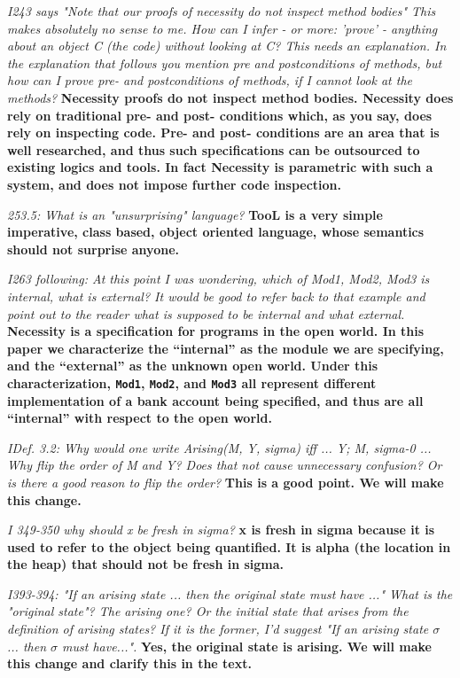 \documentclass[11pt]{amsart}
\newcommand{\rev}[1]{\emph #1}
\newcommand{\us}[1]{\bf #1}
\begin{document}
{\rev {{I243 says "Note that our proofs of necessity do not inspect method bodies" This makes absolutely no sense to me. How can I infer - or more: 'prove' - anything about an object C (the code) without looking at C? This needs an explanation. In the explanation that follows you mention pre and postconditions of methods, but how can I prove pre- and postconditions of methods, if I cannot look at the methods? }}}
{\us{Necessity proofs do not inspect method bodies. Necessity does rely on traditional pre- and post- conditions which, as you say, does rely on inspecting code. Pre- and post- conditions are an area that is well researched, and thus such specifications can be outsourced to existing logics and tools. In fact Necessity is parametric with such a system, and does not impose further code inspection.}}

{\rev {{253.5: What is an "unsurprising" language?}}}
{\us{TooL is a very simple imperative, class based, object oriented language, whose semantics should not surprise anyone.}}

{\rev {{I263 following: At this point I was wondering, which of Mod1, Mod2, Mod3 is internal, what is external? It would be good to refer back to that example and point out to the reader what is supposed to be internal and what external. }}}
{\us{Necessity is a specification for programs in the open world. In this paper we characterize the ``internal'' as the module we are specifying, and the ``external'' as the unknown open world. 
Under this characterization, \texttt{Mod1}, \texttt{Mod2}, and \texttt{Mod3} all represent different implementation of a bank account being specified, and thus
are all ``internal'' with respect to the open world.}}

 {\rev {{IDef. 3.2: Why would one write Arising(M, Y, sigma) iff ... Y; M, sigma-0 ... Why flip the order of M and Y? Does that not cause unnecessary confusion? Or is there a good reason to flip the order? }}}
 {\us{This is a good point. We will make this change.}}

{\rev {{I 349-350 why should x be fresh in sigma? }}}
{\us{x is fresh in sigma because it is used to refer to the object being quantified. It is alpha (the location in the heap) that should not be fresh in sigma.}}

{\rev {{I393-394: "If an arising state ... then the original state must have ..." What is the "original state"? The arising one? Or the initial state that arises from the definition of arising states? If it is the former, I'd suggest "If an arising state $\sigma$ ... then $\sigma$ must have...". }}}
{\us{Yes, the original state is arising. We will make this change and clarify this in the text.}}
\end{document}
